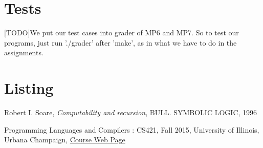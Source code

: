 \documentclass{article}
\begin{document}
\section{Tests}
[TODO]We put our test cases into grader of MP6 and MP7. So to test our programs, just run './grader' after 'make', as in what we have to do in the assignments. 

\newpage

\section{Listing}



\begin{thebibliography}{9}
  
    Robert I. Soare,
    \emph{Computability and recursion},
    BULL. SYMBOLIC LOGIC,
    1996

  Programming Languages and Compilers : CS421,
  Fall 2015,
  University of Illinois, Urbana Champaign,
\href{https://courses.engr.illinois.edu/cs421/mps/index.html}{Course Web Page}
\end{thebibliography}
\end{document}
